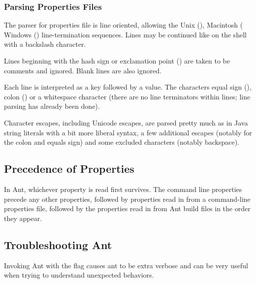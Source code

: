 \subsubsection{Parsing Properties Files}

The parser for properties file is line oriented, allowing the Unix
(), Macintosh ( Windows
() line-termination sequences.  Lines may be continued
like on the shell with a backslash character.

Lines beginning with the hash sign \code{\#} or exclamation point
(\code{!}) are taken to be comments and ignored.  Blank lines are also
ignored.

Each line is interpreted as a key followed by a value.  The characters
equal sign (\code{=}), colon (\code{:}) or a whitespace character
(there are no line terminators within lines; line parsing has already
been done).

Character escapes, including Unicode escapes, are parsed pretty much
as in Java string literals with a bit
more liberal syntax, a few additional escapes (notably for the colon
and equals sign) and some excluded characters (notably backspace).


\subsection{Precedence of Properties}

In Ant, whichever property is read first survives.  The command
line properties precede any other properties, followed by properties
read in from a command-line properties file, followed by the
properties read in from Ant build files in the order they appear.

\subsection{Troubleshooting Ant}

Invoking Ant with the  flag causes ant to be extra verbose and can be
very useful when trying to understand unexpected behaviors.



